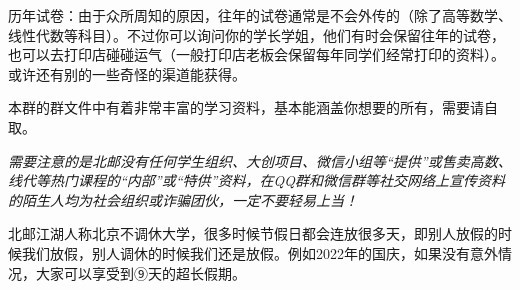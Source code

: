 历年试卷：由于众所周知的原因，往年的试卷通常是不会外传的（除了高等数学、线性代数等科目）。不过你可以询问你的学长学姐，他们有时会保留往年的试卷，也可以去打印店碰碰运气（一般打印店老板会保留每年同学们经常打印的资料）。或许还有别的一些奇怪的渠道能获得。

本群的群文件中有着非常丰富的学习资料，基本能涵盖你想要的所有，需要请自取。

\emph{需要注意的是北邮没有任何学生组织、大创项目、微信小组等“提供”或售卖高数、线代等热门课程的“内部”或“特供”资料，在QQ群和微信群等社交网络上宣传资料的陌生人均为社会组织或诈骗团伙，一定不要轻易上当！}


北邮江湖人称北京不调休大学，很多时候节假日都会连放很多天，即别人放假的时候我们放假，别人调休的时候我们还是放假。例如2022年的国庆，如果没有意外情况，大家可以享受到⑨天的超长假期。
